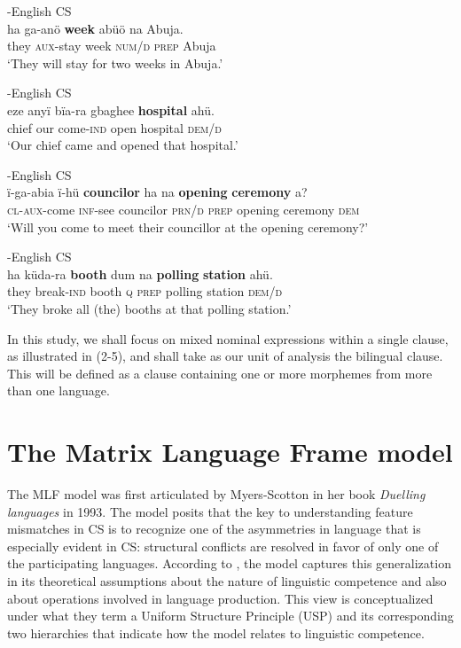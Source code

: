 \documentclass[output=paper]{langsci/langscibook}
\begin{document}
\ea\label{ex:ihemere:2}
{-English \textsc{CS}}\\
\gll ha    ga-anö     \textbf{week}  abüö  na  Abuja.\\
     they  \textsc{aux}-stay  week  \textsc{num/d}  \textsc{prep} Abuja\\
\glt ‘They will stay for two weeks in Abuja.’
\z

\ea\label{ex:ihemere:3}
{-English \textsc{CS}}\\
\gll   eze  anyï  bïa-ra        gbaghee  \textbf{hospital}  ahü.  \\
       chief   our  come-\textsc{ind}  open        hospital  \textsc{dem/d}\\
\glt   ‘Our chief came and opened that hospital.’
\z

\ea\label{ex:ihemere:4}
{-English \textsc{CS}}\\
\gll   ï-ga-abia  ï-hü  \textbf{councilor}  ha  na  \textbf{opening} \textbf{ceremony} a?\\
       \textsc{cl-aux}-come  \textsc{inf}-see  councilor  \textsc{prn/d}  \textsc{prep}  opening ceremony \textsc{dem}\\
\glt   ‘Will you come to meet their councillor at the opening ceremony?’
\z

\ea\label{ex:ihemere:5}
{-English \textsc{CS}}\\
\gll ha    küda-ra     \textbf{booth} dum   na    \textbf{polling} \textbf{station} ahü.\\
     they break-\textsc{ind}  booth  \textsc{q}  \textsc{prep}  polling station   \textsc{dem/d}\\
\glt ‘They broke all (the) booths at that polling station.’   
\z

In this study, we shall focus on mixed nominal expressions within a single clause, as illustrated in (2-5), and shall take as our unit of analysis the bilingual clause. This will be defined as a clause containing one or more morphemes from more than one language.

\section{The Matrix Language Frame model}\label{sec:ihemere:3}

The MLF model was first articulated by Myers-Scotton in her book \textit{Duelling languages} in 1993. The model posits that the key to understanding feature mismatches in CS is to recognize one of the asymmetries in language that is especially evident in CS: structural conflicts are resolved in favor of only one of the participating languages. According to \citet[72]{JakeEtAl2002}, the model captures this generalization in its theoretical assumptions about the nature of linguistic competence and also about operations involved in language production. This view is conceptualized under what they term a Uniform Structure Principle (USP) and its corresponding two hierarchies that indicate how the model relates to linguistic competence. 
\end{document}
